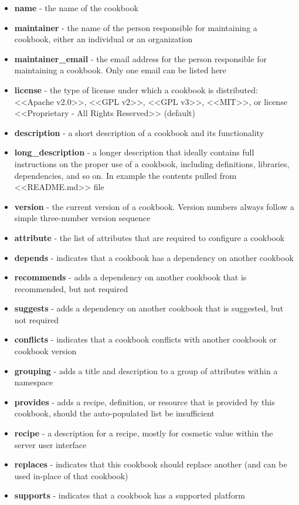 \begin{itemize}
  \item \textbf{name} - the name of the cookbook
  \item \textbf{maintainer} - the name of the person responsible for maintaining a cookbook, either an individual or an organization
  \item \textbf{maintainer\_email} - the email address for the person responsible for maintaining a cookbook. Only one email can be listed here
  \item \textbf{license} - the type of license under which a cookbook is distributed: <<Apache v2.0>>, <<GPL v2>>, <<GPL v3>>, <<MIT>>, or license <<Proprietary - All Rights Reserved>> (default)
  \item \textbf{description} - a short description of a cookbook and its functionality
  \item \textbf{long\_description} - a longer description that ideally contains full instructions on the proper use of a cookbook, including definitions, libraries, dependencies, and so on. In example the contents pulled from <<README.md>> file
  \item \textbf{version} - the current version of a cookbook. Version numbers always follow a simple three-number version sequence
  \item \textbf{attribute} - the list of attributes that are required to configure a cookbook
  \item \textbf{depends} - indicates that a cookbook has a dependency on another cookbook
  \item \textbf{recommends} - adds a dependency on another cookbook that is recommended, but not required
  \item \textbf{suggests} - adds a dependency on another cookbook that is suggested, but not required
  \item \textbf{conflicts} - indicates that a cookbook conflicts with another cookbook or cookbook version
  \item \textbf{grouping} - adds a title and description to a group of attributes within a namespace
  \item \textbf{provides} - adds a recipe, definition, or resource that is provided by this cookbook, should the auto-populated list be insufficient
  \item \textbf{recipe} - a description for a recipe, mostly for cosmetic value within the server user interface
  \item \textbf{replaces} - indicates that this cookbook should replace another (and can be used in-place of that cookbook)
  \item \textbf{supports} - indicates that a cookbook has a supported platform
\end{itemize}

